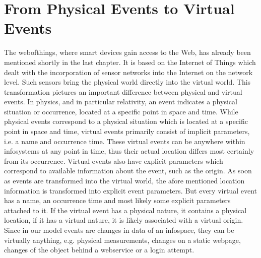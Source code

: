 \section{From Physical Events to Virtual Events}
The \textrm{\gls{webofthings}}, where smart devices gain access to the Web, has already been mentioned shortly in the last chapter.
It is based on the \textrm{Internet of Things} which dealt with the incorporation of sensor networks into the Internet on the network level.
Such sensors bring the physical world directly into the virtual world.
This transformation pictures an important difference between physical and virtual events.
In physics, and in particular relativity, an event indicates a physical situation or occurrence, located at a specific point in space and time.
While physical events correspond to a physical situation which is located at a specific point in space and time, virtual events primarily consist of implicit parameters, i.e. a name and occurrence time.
These virtual events can be anywhere within \textrm{\glspl{infosystem}} at any point in time, thus their actual location differs most certainly from its occurrence.
Virtual events also have explicit parameters which correspond to available information about the event, such as the origin.
As soon as events are transformed into the virtual world, the afore mentioned location information is transformed into explicit event parameters.
But every virtual event has a name, an occurrence time and most likely some explicit parameters attached to it.
If the virtual event has a physical nature, it contains a physical location, if it has a virtual nature, it is likely associated with a virtual origin.
Since in our model events are changes in data of an \textrm{\gls{infospace}}, they can be virtually anything, e.g. physical measurements, changes on a static webpage, changes of the object behind a \textrm{\gls{webservice}} or a login attempt.



